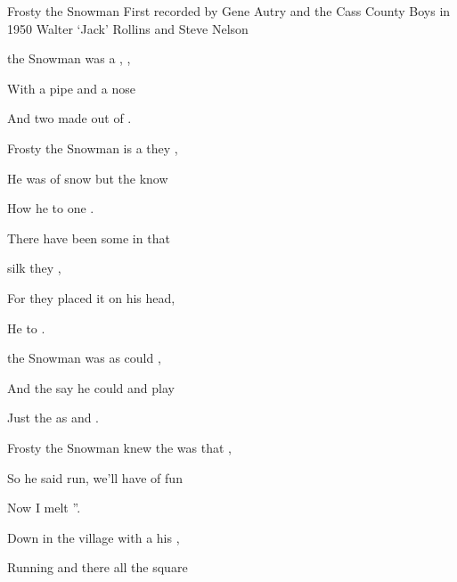\begin{SBSong}{Frosty the Snowman}
    {First recorded by Gene Autry and the Cass County Boys in 1950}
    {Walter `Jack' Rollins and Steve Nelson}
  \SBDirection{}
  \begin{SBVerse}
     the Snowman was a ,  ,
    
    With a  pipe and a  nose
    
    And two  made out of .
    
    Frosty the Snowman is a   they ,
    
    He was  of snow but the  know
    
    How he  to  one . 
  \end{SBVerse}
  \begin{SBVerse}
    There  have been some  in that
    
     silk  they ,
    
    For  they placed it on his head,
    
    He  to  .
  \end{SBVerse}
  \begin{SBVerse}
     the Snowman was  as  could ,
    
    And the  say he could  and play
    
    Just the  as  and .
  \end{SBVerse}
  
  \begin{SBVerse}
    Frosty the Snowman knew the  was  that ,
    
    So he said  run, we'll have  of fun
    
    Now  I melt ''.
    
    Down in the village with a   his ,
    
    Running  and there all  the square
    

\end{SBVerse}
\end{SBSong}
